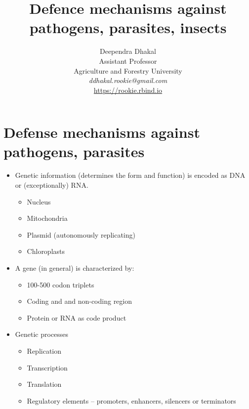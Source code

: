 \documentclass[11pt,dvipsnames,ignorenonframetext,aspectratio=169]{beamer}
\title[]{Defence mechanisms against pathogens, parasites, insects}
\author[
        \vspace{-0.5cm}Deependra Dhakal\\
Assistant Professor\\
Agriculture and Forestry University\\
\textit{ddhakal.rookie@gmail.com}\\
\url{https://rookie.rbind.io}
    ]{\vspace{-0.5cm}Deependra Dhakal\\
Assistant Professor\\
Agriculture and Forestry University\\
\textit{ddhakal.rookie@gmail.com}\\
\url{https://rookie.rbind.io}}
\date[
      
  ]{
    }
\providecommand{\tightlist}{%
  \setlength{\itemsep}{0pt}\setlength{\parskip}{0pt}}
\begin{document}
  \begin{frame}[plain]
  \titlepage
  \end{frame}



\hypertarget{defense-mechanisms-against-pathogens-parasites}{%
\section{Defense mechanisms against pathogens,
parasites}\label{defense-mechanisms-against-pathogens-parasites}}

\begin{frame}{}
\protect\hypertarget{section}{}
\begin{itemize}
\tightlist
\item
  Genetic information (determines the form and function) is encoded as
  DNA or (exceptionally) RNA.

  \begin{itemize}
  \tightlist
  \item
    Nucleus
  \item
    Mitochondria
  \item
    Plasmid (autonomously replicating)
  \item
    Chloroplasts
  \end{itemize}
\item
  A gene (in general) is characterized by:

  \begin{itemize}
  \tightlist
  \item
    100-500 codon triplets
  \item
    Coding and and non-coding region
  \item
    Protein or RNA as code product
  \end{itemize}
\item
  Genetic processes

  \begin{itemize}
  \tightlist
  \item
    Replication
  \item
    Transcription
  \item
    Translation
  \item
    Regulatory elements -- promoters, enhancers, silencers or
    terminators
  \end{itemize}
\end{itemize}
\end{frame}
\end{document}
